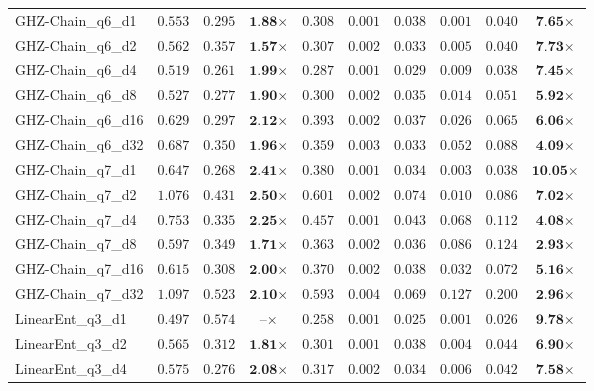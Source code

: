 \begin{table*}[t]
{\begin{tabular}{| l || r r c || r r r r r c |}
GHZ-Chain\_q6\_d1 & $0.553$ & $0.295$ & $\textbf{1.88}$$\times$ & $0.308$ & $0.001$ & $0.038$ & $0.001$ & $0.040$ & $\textbf{7.65}$$\times$ \\
GHZ-Chain\_q6\_d2 & $0.562$ & $0.357$ & $\textbf{1.57}$$\times$ & $0.307$ & $0.002$ & $0.033$ & $0.005$ & $0.040$ & $\textbf{7.73}$$\times$ \\
GHZ-Chain\_q6\_d4 & $0.519$ & $0.261$ & $\textbf{1.99}$$\times$ & $0.287$ & $0.001$ & $0.029$ & $0.009$ & $0.038$ & $\textbf{7.45}$$\times$ \\
GHZ-Chain\_q6\_d8 & $0.527$ & $0.277$ & $\textbf{1.90}$$\times$ & $0.300$ & $0.002$ & $0.035$ & $0.014$ & $0.051$ & $\textbf{5.92}$$\times$ \\
GHZ-Chain\_q6\_d16 & $0.629$ & $0.297$ & $\textbf{2.12}$$\times$ & $0.393$ & $0.002$ & $0.037$ & $0.026$ & $0.065$ & $\textbf{6.06}$$\times$ \\
GHZ-Chain\_q6\_d32 & $0.687$ & $0.350$ & $\textbf{1.96}$$\times$ & $0.359$ & $0.003$ & $0.033$ & $0.052$ & $0.088$ & $\textbf{4.09}$$\times$ \\
GHZ-Chain\_q7\_d1 & $0.647$ & $0.268$ & $\textbf{2.41}$$\times$ & $0.380$ & $0.001$ & $0.034$ & $0.003$ & $0.038$ & $\textbf{10.05}$$\times$ \\
GHZ-Chain\_q7\_d2 & $1.076$ & $0.431$ & $\textbf{2.50}$$\times$ & $0.601$ & $0.002$ & $0.074$ & $0.010$ & $0.086$ & $\textbf{7.02}$$\times$ \\
GHZ-Chain\_q7\_d4 & $0.753$ & $0.335$ & $\textbf{2.25}$$\times$ & $0.457$ & $0.001$ & $0.043$ & $0.068$ & $0.112$ & $\textbf{4.08}$$\times$ \\
GHZ-Chain\_q7\_d8 & $0.597$ & $0.349$ & $\textbf{1.71}$$\times$ & $0.363$ & $0.002$ & $0.036$ & $0.086$ & $0.124$ & $\textbf{2.93}$$\times$ \\
GHZ-Chain\_q7\_d16 & $0.615$ & $0.308$ & $\textbf{2.00}$$\times$ & $0.370$ & $0.002$ & $0.038$ & $0.032$ & $0.072$ & $\textbf{5.16}$$\times$ \\
GHZ-Chain\_q7\_d32 & $1.097$ & $0.523$ & $\textbf{2.10}$$\times$ & $0.593$ & $0.004$ & $0.069$ & $0.127$ & $0.200$ & $\textbf{2.96}$$\times$ \\
LinearEnt\_q3\_d1 & $0.497$ & $0.574$ & $\textbf{--}$$\times$ & $0.258$ & $0.001$ & $0.025$ & $0.001$ & $0.026$ & $\textbf{9.78}$$\times$ \\
LinearEnt\_q3\_d2 & $0.565$ & $0.312$ & $\textbf{1.81}$$\times$ & $0.301$ & $0.001$ & $0.038$ & $0.004$ & $0.044$ & $\textbf{6.90}$$\times$ \\
LinearEnt\_q3\_d4 & $0.575$ & $0.276$ & $\textbf{2.08}$$\times$ & $0.317$ & $0.002$ & $0.034$ & $0.006$ & $0.042$ & $\textbf{7.58}$$\times$ \\

\end{tabular}}
\end{table*}
